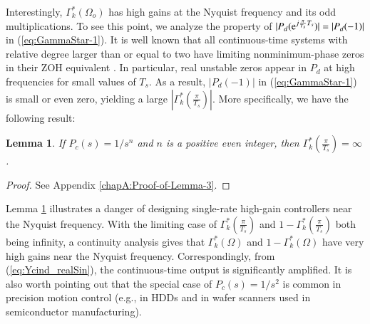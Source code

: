 \documentclass [11pt, proquest] {uwthesis}[2020/02/24]
\newtheorem{lemma}{Lemma}
\begin{document}
%
Interestingly, $\Gamma_{k}^{*}(\Omega_{o})$ has high gains at the
Nyquist frequency and its odd multiplications. To see this point,
we analyze the property of $|P_{d}(\mathrm{e}^{j\frac{\pi}{T_{s}}T_{s}})|=|P_{d}(-1)|$
in (\ref{eq:GammaStar-1}). It is well known that all continuous-time
systems with relative degree larger than or equal to two have limiting
nonminimum-phase zeros in their ZOH equivalent \cite{Astrom1984_zerosOfSampledSys}.
In particular, real unstable zeros appear in $P_{d}$ at high frequencies
for small values of $T_{s}$. As a result, $\left|P_{d}(-1)\right|$
in (\ref{eq:GammaStar-1}) is small or even zero, yielding a large
$\left|\Gamma_{k}^{*}(\frac{\pi}{T_{s}})\right|$. More specifically,
we have the following result:

\begin{lemma}\label{If--and}If $P_{c}(s)=1/s^{n}$ and $n$ is a
positive even integer, then $\Gamma_{k}^{*}(\frac{\pi}{T_{s}})=\infty$.\end{lemma}
\begin{proof}
See Appendix \ref{chapA:Proof-of-Lemma-3}.
\end{proof}
Lemma \ref{If--and} illustrates a danger of designing single-rate
high-gain controllers near the Nyquist frequency. With the limiting
case of $\Gamma_{k}^{*}(\frac{\pi}{T_{s}})$ and $1-\Gamma_{k}^{*}(\frac{\pi}{T_{s}})$
both being infinity, a continuity analysis gives that $\Gamma_{k}^{*}(\Omega)$
and $1-\Gamma_{k}^{*}(\Omega)$ have very high gains near the Nyquist
frequency. Correspondingly, from (\ref{eq:Ycind_realSin}), the continuous-time
output is significantly amplified. It is also worth pointing out that
the special case of $P_{c}(s)=1/s^{2}$ is common in precision motion
control (e.g., in HDDs \cite{AlMamun2007} and in wafer
scanners used in semiconductor manufacturing).
\end{document}
